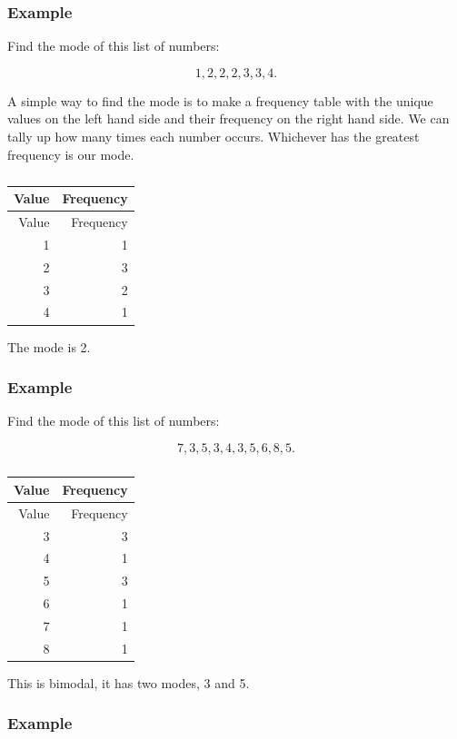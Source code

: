 \documentclass[
]{book}
\begin{document}
\hypertarget{example-3}{%
\subsubsection{Example}\label{example-3}}

Find the mode of this list of numbers:

\[ 1, 2, 2, 2, 3, 3, 4.\]

A simple way to find the mode is to make a frequency table with the unique values on the left hand side and their frequency on the right hand side. We can tally up how many times each number occurs. Whichever has the greatest frequency is our mode.

\begin{longtable}[]{@{}rr@{}}
\caption{\label{tab:table2}}\tabularnewline
\toprule
Value & Frequency \\
\midrule
\endfirsthead
\toprule
Value & Frequency \\
\midrule
\endhead
1 & 1 \\
2 & 3 \\
3 & 2 \\
4 & 1 \\
\bottomrule
\end{longtable}

The mode is 2.

\hypertarget{example-4}{%
\subsubsection{Example}\label{example-4}}

Find the mode of this list of numbers:

\[ 7, 3, 5, 3, 4, 3, 5, 6, 8, 5.\]

\begin{longtable}[]{@{}rr@{}}
\caption{\label{tab:table3}}\tabularnewline
\toprule
Value & Frequency \\
\midrule
\endfirsthead
\toprule
Value & Frequency \\
\midrule
\endhead
3 & 3 \\
4 & 1 \\
5 & 3 \\
6 & 1 \\
7 & 1 \\
8 & 1 \\
\bottomrule
\end{longtable}

This is bimodal, it has two modes, 3 and 5.

\hypertarget{example-5}{%
\subsubsection{Example}\label{example-5}}
\end{document}
